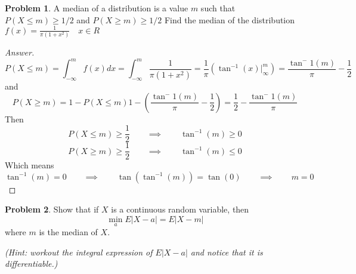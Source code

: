 \documentclass{article}
\theoremstyle{definition}
\newtheorem{problem}{Problem}
\newcommand{\qiq}{\qquad \implies \qquad}
\begin{document}
\begin{problem}

A median of a distribution is a value $m$ such that $P(X \leq m) \geq 1 / 2$ and $P(X \geq m) \geq 1 / 2$ Find the median of the distribution $f(x)=\frac{1}{\pi\left(1+x^{2}\right)} \quad x \in R$
\end{problem}


\begin{proof}[Answer]

$$P(X\leq m) = \int_{-\infty}^m f(x)dx = \int_{-\infty}^m \frac{1}{\pi\left(1+x^{2}\right)} = \frac{1}{\pi}(\tan^{-1}(x)\big|_\infty^m) = \frac{\tan^-1(m)}{\pi} - \frac{1}{2}$$
and 
$$P(X\geq m) = 1 - P(X\leq m) 1 - \left(\frac{\tan^-1(m)}{\pi} - \frac{1}{2}\right) =  \frac{1}{2} - \frac{\tan^-1(m)}{\pi}$$
Then
$$P(X\leq m)\geq \frac{1}{2} \qiq \tan^{-1}(m)\geq 0$$
$$P(X\geq m)\geq \frac{1}{2} \qiq \tan^{-1}(m)\leq 0$$
Which means
$$\tan^{-1}(m)=0 \qiq \tan(\tan^{-1}(m)) = \tan(0) \qiq \boxed{m = 0}$$
\end{proof}

\begin{problem}
Show that if $X$ is a continuous random variable, then
$$
\min _{a} E|X-a|=E|X-m|
$$
where $m$ is the median of $X$.

\textit{(Hint: workout the integral expression of $E|X-a|$ and notice that it is differentiable.)}

\end{problem}
\end{document}
